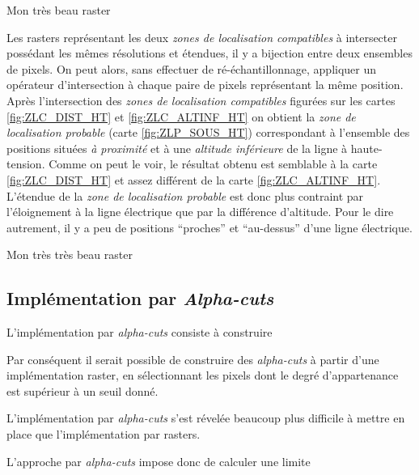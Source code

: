 \begin{carte}
  \centering
  
  \caption{Mon très beau raster}
  \label{fig:ZLC_ALTINF_HT}
\end{carte}

Les rasters représentant les deux \emph{zones de localisation
  compatibles} à intersecter possédant les mêmes résolutions et
étendues, il y a bijection entre deux ensembles de pixels. On peut
alors, sans effectuer de ré-échantillonnage, appliquer un opérateur
d'intersection à chaque paire de pixels représentant la même
position. Après l'intersection des \emph{zones de localisation
  compatibles} figurées sur les cartes \ref{fig:ZLC_DIST_HT} et
\ref{fig:ZLC_ALTINF_HT} on obtient la \emph{zone de localisation
  probable} (carte \ref{fig:ZLP_SOUS_HT}) correspondant à l'ensemble
des positions situées \emph{à proximité} et à une \emph{altitude
  inférieure} de la ligne à haute-tension. Comme on peut le voir, le
résultat obtenu est semblable à la carte \ref{fig:ZLC_DIST_HT} et
assez différent de la carte \ref{fig:ZLC_ALTINF_HT}. L'étendue de la
\emph{zone de localisation probable} est donc plus contraint par
l'éloignement à la ligne électrique que par la différence
d'altitude. Pour le dire autrement, il y a peu de positions
\enquote{proches} et \enquote{au-dessus} d'une ligne électrique.

\begin{carte}
  \centering
  
  \caption{Mon très très beau raster}
  \label{fig:ZLP_SOUS_HT}
\end{carte}


\subsection{Implémentation par \emph{Alpha-cuts}}

L'implémentation par \emph{alpha-cuts} consiste à construire

Par conséquent il serait possible de construire des \emph{alpha-cuts}
à partir d'une implémentation raster, en sélectionnant les pixels dont
le degré d'appartenance est supérieur à un seuil donné. 



L'implémentation par \emph{alpha-cuts} s'est révelée beaucoup plus
difficile à mettre en place que l'implémentation par rasters.

L'approche par \emph{alpha-cuts} impose donc de calculer une limite



